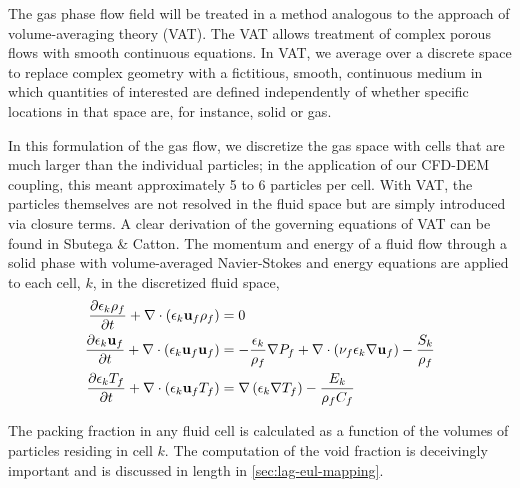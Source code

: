 The gas phase flow field will be treated in a method analogous to the approach of volume-averaging theory (VAT).\cite{Sbutega2013,whitaker1999method,Tsuji1992} The VAT allows treatment of complex porous flows with smooth continuous equations. In VAT, we average over a discrete space to replace complex geometry with a fictitious, smooth, continuous medium in which quantities of interested are defined independently of whether specific locations in that space are, for instance, solid or gas.

In this formulation of the gas flow, we discretize the gas space with cells that are much larger than the individual particles; in the application of our CFD-DEM coupling, this meant approximately 5 to 6 particles per cell. With VAT, the particles themselves are not resolved in the fluid space but are simply introduced via closure terms.\cite{Sbutega2013,Horvat2006} A clear derivation of the governing equations of VAT can be found in Sbutega \& Catton\cite{Sbutega2013}. The momentum and energy of a fluid flow through a solid phase with volume-averaged Navier-Stokes and energy equations are applied to each cell, $k$, in the discretized fluid space,
\begin{subequations}\label{eq:cfd-equations}
\begin{align}
\pder[\epsilon_k \rho_f]{t} + \nabla\cdot(\epsilon_k \vec{u}_f \rho_f) &= 0\\
\pder[\epsilon_k \vec{u}_f]{t} + \nabla\cdot(\epsilon_k \vec{u}_f \vec{u}_f) &= -\frac{\epsilon_k}{\rho_f}\nabla P_f + \nabla\cdot\left(\nu_f\epsilon_k\nabla \vec{u}_f\right) - \frac{S_k}{\rho_f}\\
\pder[\epsilon_k T_f]{t} + \nabla\cdot(\epsilon_k \vec{u}_f T_f) &= \nabla\left(\epsilon_k\nabla T_f\right)-\frac{E_k}{\rho_fC_f}
\end{align}
\end{subequations}

The packing fraction in any fluid cell is calculated as a function of the volumes of particles residing in cell $k$. The computation of the void fraction is deceivingly important and is discussed in length in \cref{sec:lag-eul-mapping}.

